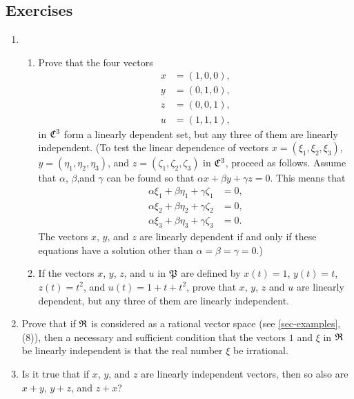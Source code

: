 {\small
\subsection*{Exercises}
\begin{enumerate}[wide]
    \item \begin{enumerate}[nosep, wide, label=(\alph*)]
        \item Prove that the four vectors
        \begin{align*}
            x & = (1, 0, 0),\\
            y & = (0, 1, 0),\\
            z & = (0, 0, 1),\\
            u & = (1, 1, 1),
        \end{align*}
        in \(\mathfrak{C}^3\) form a linearly dependent set, but any three of them are linearly independent.
        (To test the linear dependence of vectors \(x = (\xi_1, \xi_2, \xi_3)\), \(y = (\eta_1, \eta_2, \eta_3)\), and \(z = (\zeta_1, \zeta_2, \zeta_3)\) in \(\mathfrak{C}^3\), proceed as follows. Assume that \(\alpha\), \(\beta\),and \(\gamma\) can be found so that \(\alpha x + \beta y + \gamma z = 0\). This means that
        \begin{align*}
            \alpha\xi_1 + \beta\eta_1 + \gamma\zeta_1 &= 0,\\
            \alpha\xi_2 + \beta\eta_2 + \gamma\zeta_2 &= 0,\\
            \alpha\xi_3 + \beta\eta_3 + \gamma\zeta_3 &= 0.
        \end{align*}
        The vectors \(x\), \(y\), and \(z\) are linearly dependent if and only if these equations have a solution other than \(\alpha = \beta = \gamma = 0\).)
        \item If the vectors \(x\), \(y\), \(z\), and \(u\) in \(\mathfrak{P}\) are defined by \(x(t) = 1\), \(y(t) = t\), \(z(t) = t^2\), and \(u(t) = 1 + t + t^2\), prove that \(x\), \(y\), \(z\) and \(u\) are linearly dependent, but any three of them are linearly independent.
    \end{enumerate}
    \item Prove that if \(\mathfrak{R}\) is considered as a rational vector space (see
    \cref{sec-examples}, (8)), then a necessary and sufficient condition that
    the vectors \(1\) and \(\xi\) in \(\mathfrak{R}\) be linearly independent is that
    the real number \(\xi\) be irrational.

    \item Is it true that if \(x\), \(y\), and \(z\) are linearly independent vectors, then so also are \(x+y\), \(y + z\), and \(z + x\)?
    

\end{enumerate}}

